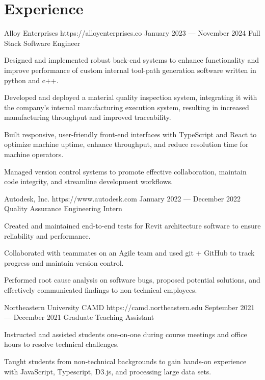 \documentclass{resume}
\begin{document}
\smallskip

\section{Experience}

\employer
    {Alloy Enterprises}
    {https://alloyenterprises.co}
    {January 2023 --- November 2024}
    {Full Stack Software Engineer}
    {\begin{jobitems}
        \item Designed and implemented robust back-end systems to enhance functionality and improve performance of custom internal tool-path generation software written in python and c++.
        \item Developed and deployed a material quality inspection system, integrating it with the company's internal manufacturing execution system, resulting in increased manufacturing throughput and improved traceability.
        \item Built responsive, user-friendly front-end interfaces with TypeScript and React to optimize machine uptime, enhance throughput, and reduce resolution time for machine operators.
        \item Managed version control systems to promote effective collaboration, maintain code integrity, and streamline development workflows.
    \end{jobitems}}

\employer
    {Autodesk, Inc.}
    {https://www.autodesk.com}
    {January 2022 --- December 2022}
    {Quality Assurance Engineering Intern}
    {\begin{jobitems}
        \item Created and maintained end-to-end tests for Revit architecture software to ensure reliability and performance.
        \item Collaborated with teammates on an Agile team and used git + GitHub to track progress and maintain version control.
        \item Performed root cause analysis on software bugs, proposed potential solutions, and effectively communicated findings to non-technical employees.
    \end{jobitems}}

\employer
    {Northeastern University CAMD}
    {https://camd.northeastern.edu}
    {September 2021--- December 2021}
    {Graduate Teaching Assistant}
    {\begin{jobitems}
        \item Instructed and assisted students one-on-one during course meetings and office hours to resolve technical challenges.
        \item Taught students from non-technical backgrounds to gain hands-on experience with JavaScript, Typescript, D3.js, and processing large data sets.
    \end{jobitems}}
\end{document}

